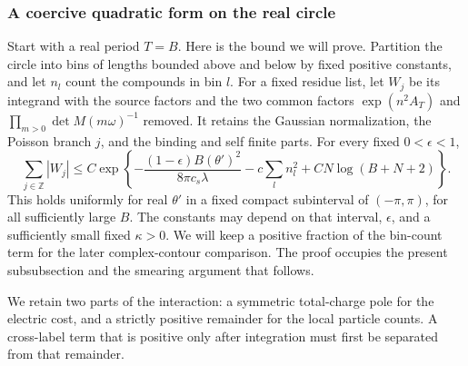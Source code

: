 \subsubsection{A coercive quadratic form on the real circle}
Start with a real period \(T=B\). Here is the bound we will prove.
Partition the circle into bins of lengths bounded above and below by
fixed positive constants, and let \(n_l\) count the compounds in bin
\(l\). For a fixed residue list, let \(W_j\) be its integrand with the
source factors and the two common factors
\(\exp(n^2A_T)\) and \(\prod_{m>0}\det M(m\omega)^{-1}\) removed.
It retains the Gaussian normalization, the Poisson branch \(j\), and
the binding and self finite parts. For every fixed \(0<\epsilon<1\),
\begin{equation}
 \sum_{j\in\mathbb Z}|W_j|
 \le C\exp\left\{
 -\frac{(1-\epsilon)B(\theta')^2}{8\pi c_s\lambda}
 -c\sum_l n_l^2+CN\log(B+N+2)\right\}.             \label{c2:eq-real-stability}
\end{equation}
This holds uniformly for real \(\theta'\) in a fixed compact subinterval
of \((-\pi,\pi)\), for all sufficiently large \(B\). The constants may
depend on that interval, \(\epsilon\), and a sufficiently small fixed
\(\kappa>0\). We will keep a positive fraction of the bin-count term
for the later complex-contour comparison. The proof occupies the present
subsubsection and the smearing argument that follows.

We retain two parts of the interaction: a symmetric total-charge pole for the electric cost, and a
strictly positive remainder for the local particle counts. A cross-label
term that is positive only after integration must first be separated
from that remainder.

